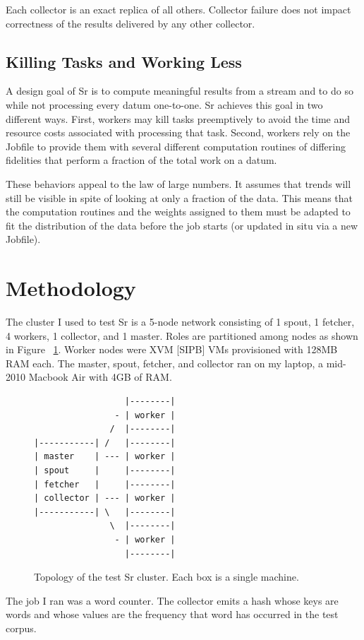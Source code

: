 \documentclass[12pt]{article}
\begin{document}
Each collector is an exact replica of all others. Collector failure does not impact correctness of the results delivered by any other collector.
\subsection{Killing Tasks and Working Less}
A design goal of Sr is to compute meaningful results from a stream and to do so while not processing every datum one-to-one. Sr achieves this goal in two different ways. First, workers may kill tasks preemptively to avoid the time and resource costs associated with processing that task. Second, workers rely on the Jobfile to provide them with several different computation routines of differing fidelities that perform a fraction of the total work on a datum.

These behaviors appeal to the law of large numbers. It assumes that trends will still be visible in spite of looking at only a fraction of the data. This means that the computation routines and the weights assigned to them must be adapted to fit the distribution of the data before the job starts (or updated in situ via a new Jobfile).

\section{Methodology}
The cluster I used to test Sr is a 5-node network consisting of 1 spout, 1 fetcher, 4 workers, 1 collector, and 1 master. Roles are partitioned among nodes as shown in Figure ~\ref{fig:clusterDiagram}. Worker nodes were XVM [SIPB] VMs provisioned with 128MB RAM each. The master, spout, fetcher, and collector ran on my laptop, a mid-2010 Macbook Air with 4GB of RAM.

\begin{figure}
\begin{verbatim}
                  |--------|
                - | worker |
               /  |--------|
|-----------| /   |--------|
| master    | --- | worker |
| spout     |     |--------|
| fetcher   |     |--------|
| collector | --- | worker |
|-----------| \   |--------|
               \  |--------|
                - | worker |
                  |--------|

\end{verbatim}
\caption{Topology of the test Sr cluster. Each box is a single machine.}
\label{fig:clusterDiagram}
\end{figure}

The job I ran was a word counter. The collector emits a hash whose keys are words and whose values are the frequency that word has occurred in the test corpus.
\end{document}
